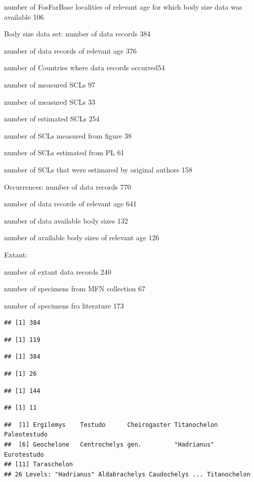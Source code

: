 \documentclass[]{article}
\begin{document}
number of FosFarBase localities of relevant age for which body size data
was available 106

Body size data set: number of data records 384

number of data records of relevant age 376

number of Countries where data records occurred54

number of measured SCLs 97

number of measured SCLs 33

number of estimated SCLs 254

number of SCLs measured from figure 38

number of SCLs estimated from PL 61

number of SCLs that were estimared by original authors 158

Occurrences: number of data records 770

number of data records of relevant age 641

number of data available body sizes 132

number of available body sizes of relevant age 126

Extant:

number of extant data records 240

number of specimens from MFN collection 67

number of specimens fro literature 173

\begin{verbatim}
## [1] 384
\end{verbatim}

\begin{verbatim}
## [1] 119
\end{verbatim}

\begin{verbatim}
## [1] 384
\end{verbatim}

\begin{verbatim}
## [1] 26
\end{verbatim}

\begin{verbatim}
## [1] 144
\end{verbatim}

\begin{verbatim}
## [1] 11
\end{verbatim}

\begin{verbatim}
##  [1] Ergilemys    Testudo      Cheirogaster Titanochelon Paleotestudo
##  [6] Geochelone   Centrochelys gen.         "Hadrianus"  Eurotestudo 
## [11] Taraschelon 
## 26 Levels: "Hadrianus" Aldabrachelys Caudochelys ... Titanochelon
\end{verbatim}
\end{document}
